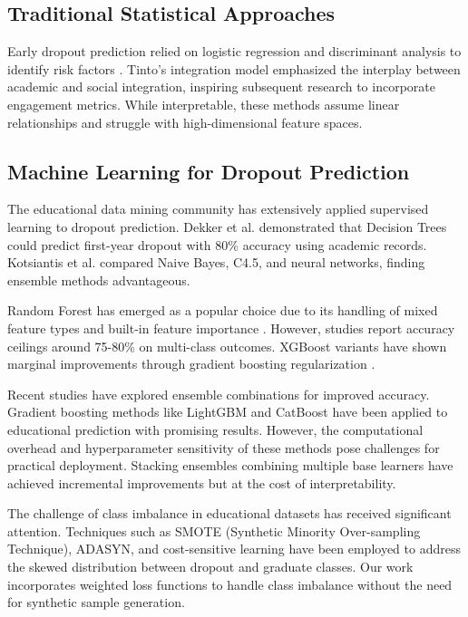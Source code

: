\documentclass[journal]{IEEEtran}
\begin{document}
\subsection{Traditional Statistical Approaches}

Early dropout prediction relied on logistic regression and discriminant analysis to identify risk factors \cite{tinto1975dropout,bean1980dropouts}. Tinto's integration model \cite{tinto1993leaving} emphasized the interplay between academic and social integration, inspiring subsequent research to incorporate engagement metrics. While interpretable, these methods assume linear relationships and struggle with high-dimensional feature spaces.

\subsection{Machine Learning for Dropout Prediction}

The educational data mining community has extensively applied supervised learning to dropout prediction. Dekker et al. \cite{dekker2009predicting} demonstrated that Decision Trees could predict first-year dropout with 80\% accuracy using academic records. Kotsiantis et al. \cite{kotsiantis2003preventing} compared Naive Bayes, C4.5, and neural networks, finding ensemble methods advantageous.

Random Forest has emerged as a popular choice due to its handling of mixed feature types and built-in feature importance \cite{marquez2016predicting}. However, studies report accuracy ceilings around 75-80\% on multi-class outcomes. XGBoost variants have shown marginal improvements through gradient boosting regularization \cite{chen2016xgboost}.

Recent studies have explored ensemble combinations for improved accuracy. Gradient boosting methods like LightGBM and CatBoost have been applied to educational prediction with promising results. However, the computational overhead and hyperparameter sensitivity of these methods pose challenges for practical deployment. Stacking ensembles combining multiple base learners have achieved incremental improvements but at the cost of interpretability.

The challenge of class imbalance in educational datasets has received significant attention. Techniques such as SMOTE (Synthetic Minority Over-sampling Technique), ADASYN, and cost-sensitive learning have been employed to address the skewed distribution between dropout and graduate classes. Our work incorporates weighted loss functions to handle class imbalance without the need for synthetic sample generation.
\end{document}
